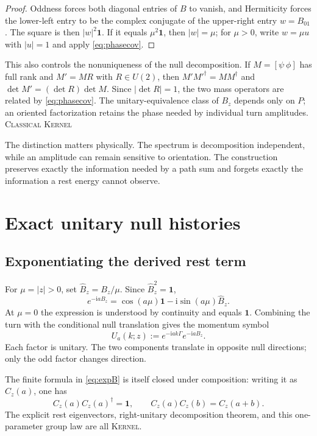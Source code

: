 \documentclass[11pt]{article}
\newcommand{\Kernel}{\textcolor{kernelcolor}{\textsc{Kernel}}}
\newcommand{\Classical}{\textcolor{classicalcolor}{\textsc{Classical}}}
\newcommand{\ii}{\mathrm{i}}
\newcommand{\id}{\mathbf{1}}
\begin{document}
\begin{proof}
Oddness forces both diagonal entries of $B$ to vanish, and Hermiticity forces
the lower-left entry to be the complex conjugate of the upper-right entry
$w=B_{01}$.  The square is then $|w|^2\id$.  If it equals $\mu^2\id$, then
$|w|=\mu$; for $\mu>0$, write $w=\mu u$ with $|u|=1$ and apply
\eqref{eq:phasecov}.
\end{proof}

This also controls the nonuniqueness of the null decomposition.  If
$M=[\psi\ \phi]$ has full rank and $M'=MR$ with $R\in U(2)$, then
$M'M'^\dagger=MM^\dagger$ and
$\det M'=(\det R)\det M$.  Since $|\det R|=1$, the two mass operators are
related by \eqref{eq:phasecov}.  The unitary-equivalence class of $B_z$ depends
only on $P$; an oriented factorization retains the phase needed by individual
turn amplitudes.  \Classical{} \Kernel{}

The distinction matters physically.  The spectrum is decomposition
independent, while an amplitude can remain sensitive to orientation.  The
construction preserves exactly the information needed by a path sum and
forgets exactly the information a rest energy cannot observe.

\section{Exact unitary null histories}

\subsection{Exponentiating the derived rest term}

For $\mu=|z|>0$, set $\widehat B_z=B_z/\mu$.  Since
$\widehat B_z^2=\id$,
\begin{equation}\label{eq:expB}
 e^{-\ii aB_z}
 =\cos(a\mu)\id-\ii\sin(a\mu)\widehat B_z.
\end{equation}
At $\mu=0$ the expression is understood by continuity and equals $\id$.
Combining the turn with the conditional null translation gives the momentum
symbol
\begin{equation}\label{eq:walk}
 U_a(k;z):=e^{-\ii ak\Gamma}e^{-\ii aB_z}.
\end{equation}
Each factor is unitary.  The two components translate in opposite null
directions; only the odd factor changes direction.

The finite formula in \eqref{eq:expB} is itself closed under composition:
writing it as $C_z(a)$, one has
\begin{equation}
 C_z(a)C_z(a)^\dagger=\id,
 \qquad
 C_z(a)C_z(b)=C_z(a+b).
\end{equation}
The explicit rest eigenvectors, right-unitary decomposition theorem, and this
one-parameter group law are all \Kernel{}.
\end{document}
